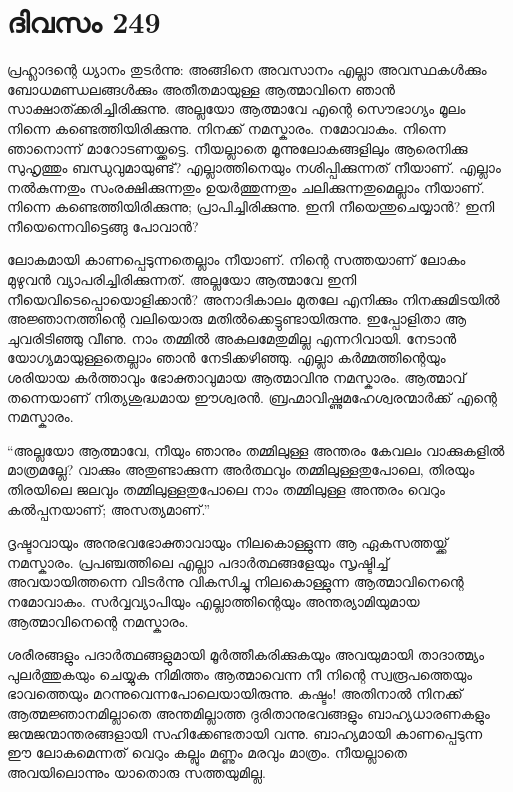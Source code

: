 \section{ദിവസം 249}


പ്രഹ്ലാദന്റെ ധ്യാനം തുടര്‍ന്നു: അങ്ങിനെ അവസാനം എല്ലാ അവസ്ഥകള്‍ക്കും ബോധമണ്ഡലങ്ങള്‍ക്കും അതീതമായുള്ള ആത്മാവിനെ ഞാന്‍ സാക്ഷാത്ക്കരിച്ചിരിക്കുന്നു. അല്ലയോ ആത്മാവേ എന്റെ സൌഭാഗ്യം മൂലം നിന്നെ  കണ്ടെത്തിയിരിക്കുന്നു. നിനക്ക് നമസ്കാരം. നമോവാകം. നിന്നെ ഞാനൊന്ന് മാറോടണയ്ക്കട്ടെ. നീയല്ലാതെ മൂന്നുലോകങ്ങളിലും ആരെനിക്കു സുഹൃത്തും ബന്ധുവുമായുണ്ട്? എല്ലാത്തിനെയും നശിപ്പിക്കുന്നത് നീയാണ്. എല്ലാം നല്‍കുന്നതും സംരക്ഷിക്കുന്നതും ഉയര്‍ത്തുന്നതും ചലിക്കുന്നതുമെല്ലാം നീയാണ്. നിന്നെ കണ്ടെത്തിയിരിക്കുന്നു; പ്രാപിച്ചിരിക്കുന്നു. ഇനി നീയെന്തുചെയ്യാന്‍? ഇനി നീയെന്നെവിട്ടെങ്ങു പോവാന്‍?

ലോകമായി കാണപ്പെടുന്നതെല്ലാം നീയാണ്. നിന്റെ സത്തയാണ് ലോകം മുഴുവന്‍ വ്യാപരിച്ചിരിക്കുന്നത്. അല്ലയോ ആത്മാവേ ഇനി നീയെവിടെപ്പൊയൊളിക്കാന്‍? അനാദികാലം മുതലേ എനിക്കും നിനക്കുമിടയില്‍  അജ്ഞാനത്തിന്റെ വലിയൊരു മതില്‍ക്കെട്ടുണ്ടായിരുന്നു. ഇപ്പോളിതാ ആ ചുവരിടിഞ്ഞു വീണു. നാം തമ്മില്‍ അകലമേതുമില്ല എന്നറിവായി. നേടാന്‍ യോഗ്യമായുള്ളതെല്ലാം ഞാന്‍  നേടിക്കഴിഞ്ഞു. എല്ലാ കര്‍മ്മത്തിന്റെയും ശരിയായ  കര്‍ത്താവും ഭോക്താവുമായ ആത്മാവിനു നമസ്കാരം. ആത്മാവ് തന്നെയാണ് നിത്യശുദ്ധമായ ഈശ്വരന്‍. ബ്രഹ്മാവിഷ്ണുമഹേശ്വരന്മാര്‍ക്ക് എന്റെ നമസ്കാരം.

“അല്ലയോ ആത്മാവേ, നീയും ഞാനും തമ്മിലുള്ള അന്തരം കേവലം വാക്കുകളില്‍ മാത്രമല്ലേ? വാക്കും അതുണ്ടാക്കുന്ന അര്‍ത്ഥവും തമ്മിലുള്ളതുപോലെ, തിരയും തിരയിലെ ജലവും തമ്മിലുള്ളതുപോലെ നാം തമ്മിലുള്ള അന്തരം വെറും കല്‍പ്പനയാണ്; അസത്യമാണ്.”

ദൃഷ്ടാവായും അനുഭവഭോക്താവായും നിലകൊള്ളുന്ന ആ ഏകസത്തയ്ക്ക്  നമസ്കാരം. പ്രപഞ്ചത്തിലെ എല്ലാ പദാര്‍ത്ഥങ്ങളേയും സൃഷ്ടിച്ച് അവയായിത്തന്നെ വിടര്‍ന്നു വികസിച്ചു നിലകൊള്ളുന്ന ആത്മാവിനെന്റെ നമോവാകം. സര്‍വ്വവ്യാപിയും എല്ലാത്തിന്റെയും അന്തര്യാമിയുമായ   ആത്മാവിനെന്റെ നമസ്കാരം.

ശരീരങ്ങളും പദാര്‍ത്ഥങ്ങളുമായി മൂര്‍ത്തീകരിക്കുകയും അവയുമായി താദാത്മ്യം പുലര്‍ത്തുകയും ചെയ്യുക നിമിത്തം ആത്മാവെന്ന നീ നിന്റെ സ്വരൂപത്തെയും ഭാവത്തെയും മറന്നുവെന്നപോലെയായിരുന്നു. കഷ്ടം! അതിനാല്‍ നിനക്ക് ആത്മജ്ഞാനമില്ലാതെ അന്തമില്ലാത്ത ദുരിതാനുഭവങ്ങളും ബാഹ്യധാരണകളും ജന്മജന്മാന്തരങ്ങളായി സഹിക്കേണ്ടതായി വന്നു. ബാഹ്യമായി കാണപ്പെടുന്ന ഈ ലോകമെന്നത് വെറും കല്ലും മണ്ണും മരവും മാത്രം. നീയല്ലാതെ അവയിലൊന്നും യാതൊരു സത്തയുമില്ല.

